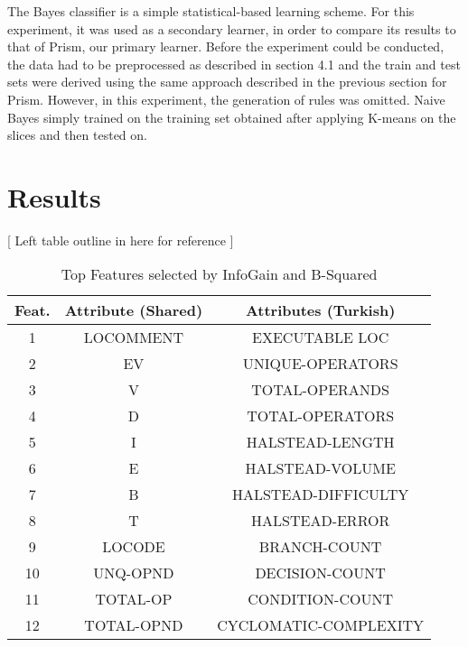 \documentclass{sig-alternate}
\begin{document}
The Bayes classifier is a simple statistical-based learning scheme. For this experiment, it was used as a secondary learner, in order to compare its results to that of Prism, our primary learner. Before the experiment could be conducted, the data had to be preprocessed as described in section 4.1 and the train and test sets were derived using the same approach described in the previous section for Prism. However, in this experiment, the generation of rules was omitted. Naive Bayes simply trained on the training set obtained after applying K-means on the slices and then tested on.


\section{Results}
[ Left table outline in here for reference ]

\begin{table}[h]
\centering
\caption{Top Features selected by InfoGain and B-Squared}
\begin{tabular}{|c|c|c|} \hline
Feat.&Attribute (Shared)&Attributes (Turkish)\\\hline
1& LOCOMMENT & EXECUTABLE LOC\\ \hline
2& EV & UNIQUE-OPERATORS\\ \hline
3& V & TOTAL-OPERANDS\\ \hline
4& D & TOTAL-OPERATORS\\ \hline
5& I & HALSTEAD-LENGTH\\ \hline
6& E & HALSTEAD-VOLUME\\ \hline
7& B & HALSTEAD-DIFFICULTY\\ \hline
8& T & HALSTEAD-ERROR\\ \hline
9& LOCODE & BRANCH-COUNT\\ \hline
10& UNQ-OPND & DECISION-COUNT\\ \hline
11& TOTAL-OP & CONDITION-COUNT\\ \hline
12& TOTAL-OPND & CYCLOMATIC-COMPLEXITY\\ \hline

\hline\end{tabular}
\end{table}
\end{document}
